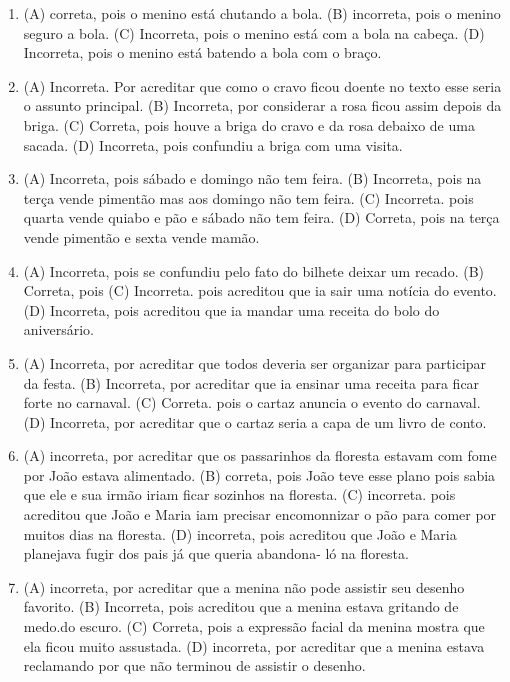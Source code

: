 \begin{enumerate}
\item
(A) correta, pois o menino está chutando a bola.
(B) incorreta, pois o menino seguro a bola.
(C) Incorreta, pois o menino está com a bola na cabeça.
(D) Incorreta, pois o menino está batendo a bola com o braço.

\item
(A) Incorreta. Por acreditar que como o cravo ficou doente no texto esse seria o assunto principal.
(B) Incorreta, por considerar a rosa ficou assim depois da briga.
(C) Correta, pois houve a briga do cravo e da rosa debaixo de uma sacada.
(D) Incorreta, pois confundiu a briga com uma visita.

\item
(A) Incorreta, pois sábado e domingo não tem feira.
(B) Incorreta, pois na terça vende pimentão mas aos domingo não tem feira.
(C) Incorreta. pois quarta vende quiabo e pão e sábado não tem feira.
(D) Correta, pois na terça vende pimentão e sexta vende mamão.

\item
(A) Incorreta, pois se confundiu pelo fato do bilhete deixar um recado.
(B) Correta, pois
(C) Incorreta. pois acreditou que ia sair uma notícia do evento.
(D) Incorreta, pois acreditou que ia mandar uma receita do bolo do aniversário.

\item
(A) Incorreta, por acreditar que todos deveria ser organizar para
participar da festa.
(B) Incorreta, por acreditar que ia ensinar uma receita para ficar
forte no carnaval.
(C) Correta. pois o cartaz anuncia o evento do carnaval.
(D) Incorreta, por acreditar que o cartaz seria a capa de um livro de
conto.

\item
(A) incorreta, por acreditar que os passarinhos da floresta estavam com
fome por João estava alimentado.
(B) correta, pois João teve esse plano pois sabia que ele e sua irmão
iriam ficar sozinhos na floresta.
(C) incorreta. pois acreditou que João e Maria iam precisar encomonnizar
o pão para comer por muitos dias na floresta.
(D) incorreta, pois acreditou que João e Maria planejava fugir dos pais
já que queria abandona- ló na floresta.

\item
(A) incorreta, por acreditar que a menina não pode assistir seu desenho
favorito.
(B) Incorreta, pois acreditou que a menina estava gritando de medo.do
escuro.
(C) Correta, pois a expressão facial da menina mostra que ela ficou
muito assustada.
(D) incorreta, por acreditar que a menina estava reclamando por que não
terminou de assistir o desenho.
\end{enumerate}

